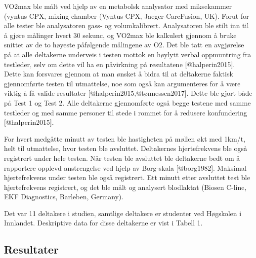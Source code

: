 \documentclass[
]{article}
\begin{document}
VO2max ble målt ved hjelp av en metabolsk analysator med miksekammer
(vyntus CPX, mixing chamber (Vyntus CPX, Jaeger-CareFusion, UK). Forut
for alle tester ble analysatoren gass- og volumkalibrert. Analysatoren
ble stilt inn til å gjøre målinger hvert 30 sekunc, og VO2max ble
kalkulert gjennom å bruke snittet av de to høyeste påfølgende målingene
av O2. Det ble tatt en avgjørelse på at alle deltakerne underveis i
testen mottok en høylytt verbal oppmuntring fra testleder, selv om dette
vil ha en påvirkning på resultatene {[}@halperin2015{]}. Dette kan
forsvares gjennom at man ønsket å bidra til at deltakerne faktisk
gjennomførte testen til utmattelse, noe som også kan argumenteres for å
være viktig å få valide resultater {[}@halperin2015,@tønnessen2017{]}.
Dette ble gjort både på Test 1 og Test 2. Alle deltakerne gjennomførte
også begge testene med samme testleder og med samme personer til stede i
rommet for å redusere konfundering {[}@halperin2015{]}.

For hvert medgåtte minutt av testen ble hastigheten på møllen økt med
1km/t, helt til utmattelse, hvor testen ble avsluttet. Deltakernes
hjertefrekvens ble også registrert under hele testen. Når testen ble
avsluttet ble deltakerne bedt om å rapportere opplevd anstrengelse ved
hjelp av Borg-skala {[}@borg1982{]}. Maksimal hjertefrekvens under
testen ble også registrert. Ett minutt etter avsluttet test ble
hjertefrekvens registrert, og det ble målt og analysert blodlaktat
(Biosen C-line, EKF Diagnostics, Barleben, Germany).

Det var 11 deltakere i studien, samtlige deltakere er studenter ved
Høgskolen i Innlandet. Deskriptive data for disse deltakerne er vist i
Tabell 1.

\hypertarget{resultater}{%
\subsection{Resultater}\label{resultater}}

\providecommand{\docline}[3]{\noalign{\global\setlength{\arrayrulewidth}{#1}}\arrayrulecolor[HTML]{#2}\cline{#3}}

\setlength{\tabcolsep}{2pt}

\renewcommand*{\arraystretch}{1.5}
\end{document}

